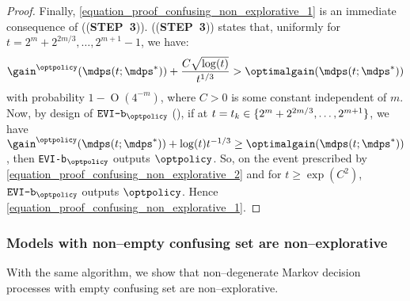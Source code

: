 \documentclass[preprint,cleveref,12pt]{colt2025}
\DeclarePairedDelimiter{\braces}{\{}{\}}	%
\DeclareMathOperator*{\OH}{\mathrm{O}}
\def\models{\mdps}
\def\optgain{\optimalgain} %
\def\STEP#1{(\strong{STEP~#1})}
\newcommand{\strong}[1]{\textbf{#1}}
\begin{document}
\begin{proof}
        Finally, \eqref{equation_proof_confusing_non_explorative_1} is an immediate consequence of (\STEP{3}). 
        (\STEP{3}) states that, uniformly for $t = 2^m + 2^{2m/3}, \ldots, 2^{m+1}-1$, we have:
        \begin{equation}
        \label{equation_proof_confusing_non_explorative_2}
            \gain^{\optpolicy}(\models(t; \models^*))
            +
            \frac{C \sqrt{\log(t)}}{t^{1/3}}
            >
            \optgain(\models(t; \models^*))
        \end{equation}
        with probability $1 - \OH(4^{-m})$, where $C > 0$ is some constant independent of $m$. 
        Now, by design of $\texttt{EVI-b}_{\optpolicy}$ (), if at $t = t_k \in \braces{2^m + 2^{2m/3}, \ldots, 2^{m+1}}$, we have $\gain^{\optpolicy}(\models(t; \models^*)) + \log(t) t^{-1/3} \ge \optgain(\models(t; \models^*))$, then \texttt{EVI-b}$_{\optpolicy}$ outputs $\optpolicy$. 
        So, on the event prescribed by \eqref{equation_proof_confusing_non_explorative_2} and for $t \ge \exp(C^2)$, $\texttt{EVI-b}_{\optpolicy}$ outputs $\optpolicy$. 
        Hence \eqref{equation_proof_confusing_non_explorative_1}.
    \end{proof}
    \def\proofname{Proof}

    \subsubsection{Models with non--empty confusing set are non--explorative}

    With the same algorithm, we show that non--degenerate Markov decision processes with empty confusing set are non--explorative.
\end{document}
